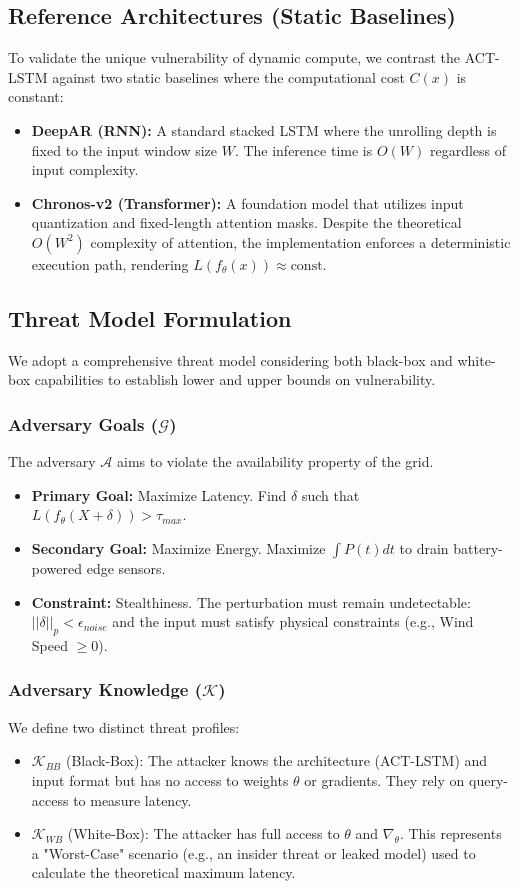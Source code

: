 \documentclass[conference]{IEEEtran}
\begin{document}
\subsection{Reference Architectures (Static Baselines)}
To validate the unique vulnerability of dynamic compute, we contrast the ACT-LSTM against two static baselines where the computational cost $C(x)$ is constant:
\begin{itemize}
    \item \textbf{DeepAR (RNN):} A standard stacked LSTM where the unrolling depth is fixed to the input window size $W$. The inference time is $O(W)$ regardless of input complexity.
    \item \textbf{Chronos-v2 (Transformer):} A foundation model that utilizes input quantization and fixed-length attention masks. Despite the theoretical $O(W^2)$ complexity of attention, the implementation enforces a deterministic execution path, rendering $L(f_\theta(x)) \approx \text{const}$.
\end{itemize}

\subsection{Threat Model Formulation}
We adopt a comprehensive threat model considering both black-box and white-box capabilities to establish lower and upper bounds on vulnerability.

\subsubsection{Adversary Goals ($\mathcal{G}$)}
The adversary $\mathcal{A}$ aims to violate the availability property of the grid.
\begin{itemize}
    \item \textbf{Primary Goal:} Maximize Latency. Find $\delta$ such that $L(f_\theta(X + \delta)) > \tau_{max}$.
    \item \textbf{Secondary Goal:} Maximize Energy. Maximize $\int P(t) dt$ to drain battery-powered edge sensors.
    \item \textbf{Constraint:} Stealthiness. The perturbation must remain undetectable: $||\delta||_p < \epsilon_{noise}$ and the input must satisfy physical constraints (e.g., Wind Speed $\ge 0$).
\end{itemize}

\subsubsection{Adversary Knowledge ($\mathcal{K}$)}
We define two distinct threat profiles:
\begin{itemize}
    \item $\mathcal{K}_{BB}$ (Black-Box): The attacker knows the architecture (ACT-LSTM) and input format but has no access to weights $\theta$ or gradients. They rely on query-access to measure latency.
    \item $\mathcal{K}_{WB}$ (White-Box): The attacker has full access to $\theta$ and $\nabla_\theta$. This represents a "Worst-Case" scenario (e.g., an insider threat or leaked model) used to calculate the theoretical maximum latency.
\end{itemize}
\end{document}

